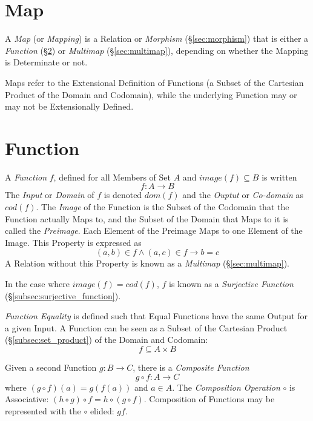 \documentclass{article}
\begin{document}
\section{Map}\label{sec:set_map}

A \emph{Map} (or \emph{Mapping}) is a Relation or \emph{Morphism}
(\S\ref{sec:morphism}) that is either a \emph{Function}
(\S\ref{sec:set_function}) or \emph{Multimap} (\S\ref{sec:multimap}),
depending on whether the Mapping is Determinate or not.

Maps refer to the Extensional Definition of Functions (a Subset of the
Cartesian Product of the Domain and Codomain), while the underlying
Function may or may not be Extensionally Defined.



\section{Function}\label{sec:set_function}

A \emph{Function} $f$, defined for all Members of Set $A$ and $image(f)
\subseteq B$ is written
\[
    f : A \rightarrow B
\]
The \emph{Input} or \emph{Domain} of $f$ is denoted $dom(f)$ and the
\emph{Ouptut} or \emph{Co-domain} as $cod(f)$. The \emph{Image} of the
Function is the Subset of the Codomain that the Function actually Maps
to, and the Subset of the Domain that Maps to it is called the
\emph{Preimage}. Each Element of the Preimage Maps to one Element of
the Image. This Property is expressed as
\[
    (a,b) \in f \wedge (a,c) \in f \rightarrow b = c
\]
A Relation without this Property is known as a \emph{Multimap}
(\S\ref{sec:multimap}).

In the case where $image(f) = cod(f)$, $f$ is known as a
\emph{Surjective Function} (\S\ref{subsec:surjective_function}).

\emph{Function Equality} is defined such that Equal Functions have the
same Output for a given Input. A Function can be seen as a Subset of
the Cartesian Product (\S\ref{subsec:set_product}) of the Domain and
Codomain:
\[
    f \subseteq A \times B
\]

Given a second Function $g : B \rightarrow C$, there is a
\emph{Composite Function}
\[
    g \circ f : A \rightarrow C
\]
where $(g \circ f)(a) = g(f(a))$ and $a \in A$. The \emph{Composition
  Operation} $\circ$ is Associative: $(h \circ g) \circ f = h \circ (g
\circ f)$. Composition of Functions may be represented with the
$\circ$ elided: $gf$.
\end{document}
